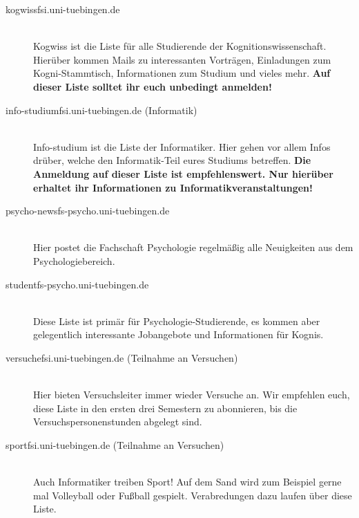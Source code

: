 \begin{description}

  \item[kogwiss\At fsi.uni-tuebingen.de] ~\\
    Kogwiss ist die Liste für alle Studierende der Kognitionswissenschaft. Hierüber kommen Mails zu interessanten Vorträgen, Einladungen zum Kogni-Stammtisch, Informationen zum Studium und vieles mehr. \textbf{Auf dieser Liste solltet ihr euch unbedingt anmelden!}

    
\item[info-studium\At fsi.uni-tuebingen.de (Informatik)] ~\\
    Info-studium ist die Liste der Informatiker. Hier gehen vor allem Infos drüber, welche den Informatik-Teil eures Studiums betreffen. \textbf{Die Anmeldung auf dieser Liste ist empfehlenswert. Nur hierüber erhaltet ihr Informationen zu Informatikveranstaltungen!}
	  
    
\item[psycho-news\At fs-psycho.uni-tuebingen.de] ~\\
    Hier postet die Fachschaft Psychologie regelmäßig alle Neuigkeiten aus dem Psychologiebereich.  

    
    
\item[student\At fs-psycho.uni-tuebingen.de] ~\\
    Diese Liste ist primär für Psychologie-Studierende, es kommen aber gelegentlich interessante Jobangebote und Informationen für Kognis. 


    
  \item[versuche\At fsi.uni-tuebingen.de (Teilnahme an Versuchen)] ~\\
	 Hier bieten Versuchsleiter immer wieder Versuche an. Wir empfehlen euch, diese Liste in den ersten drei Semestern zu abonnieren, bis die Versuchspersonenstunden abgelegt sind.
  
  
    \item[sport\At fsi.uni-tuebingen.de (Teilnahme an Versuchen)] ~\\
Auch Informatiker treiben Sport! Auf dem Sand wird zum Beispiel gerne mal Volleyball oder Fußball gespielt. Verabredungen dazu laufen über diese Liste.
  

\end{description}
